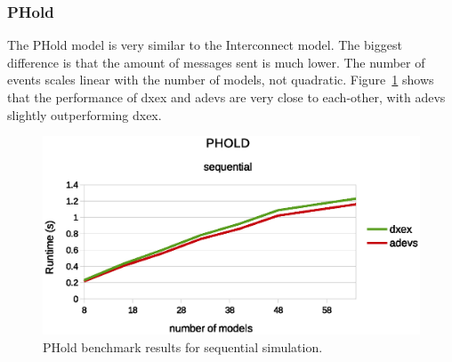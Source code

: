 \subsubsection{PHold}
\label{4-seq-PHold}
The PHold model is very similar to the Interconnect model.
The biggest difference is that the amount of messages sent is much lower.
The number of events scales linear with the number of models, not quadratic.
Figure~\ref{fig:Phold_benchmark} shows that the performance of dxex and adevs are very close to each-other, with adevs slightly outperforming dxex.
\begin{figure}
	\center
	\includegraphics[width=\columnwidth]{fig/phold_sequential.eps}
	\caption{PHold benchmark results for sequential simulation.}
	\label{fig:Phold_benchmark}
\end{figure}
